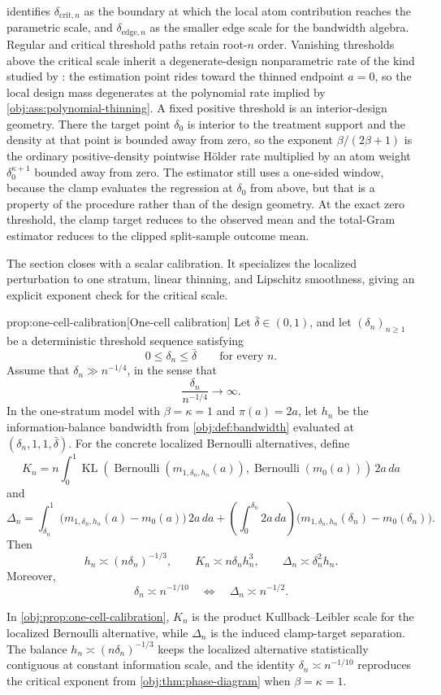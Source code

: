  identifies \(\delta_{\mathrm{crit},n}\) as the boundary at which the local atom contribution reaches the parametric scale, and \(\delta_{\mathrm{edge},n}\) as the smaller edge scale for the bandwidth algebra. Regular and critical threshold paths retain root-\(n\) order. Vanishing thresholds above the critical scale inherit a degenerate-design nonparametric rate of the kind studied by \citet{Gaiffas2005DegenerateDesign}: the estimation point rides toward the thinned endpoint \(a=0\), so the local design mass degenerates at the polynomial rate implied by \cref{obj:ass:polynomial-thinning}. A fixed positive threshold is an interior-design geometry. There the target point \(\delta_0\) is interior to the treatment support and the density at that point is bounded away from zero, so the exponent \(\beta/(2\beta+1)\) is the ordinary positive-density pointwise Hölder rate \citep{Stone1982,Donoho1991} multiplied by an atom weight \(\delta_0^{\kappa+1}\) bounded away from zero. The estimator still uses a one-sided window, because the clamp evaluates the regression at \(\delta_0\) from above, but that is a property of the procedure rather than of the design geometry. At the exact zero threshold, the clamp target reduces to the observed mean and the total-Gram estimator reduces to the clipped split-sample outcome mean.

The section closes with a scalar calibration. It specializes the localized perturbation to one stratum, linear thinning, and Lipschitz smoothness, giving an explicit exponent check for the critical scale.

\begin{propositionv}{prop:one-cell-calibration}[One-cell calibration]
Let \(\bar\delta\in(0,1)\), and let \((\delta_n)_{n\geq1}\) be a deterministic threshold sequence satisfying
\[
0\leq \delta_n\leq \bar\delta
\qquad\text{for every }n .
\]
Assume that \(\delta_n\gg n^{-1/4}\), in the sense that
\[
\frac{\delta_n}{n^{-1/4}}\longrightarrow\infty .
\]
In the one-stratum model with \(\beta=\kappa=1\) and \(\pi(a)=2a\), let \(h_n\) be the information-balance bandwidth from \cref{obj:def:bandwidth} evaluated at \((\delta_n,1,1,\bar\delta)\). For the concrete localized Bernoulli alternatives, define
\[
K_n
=
n\int_0^1
\operatorname{KL}\!\left(
\operatorname{Bernoulli}(m_{1,\delta_n,h_n}(a)),
\operatorname{Bernoulli}(m_0(a))
\right)\,2a\,da
\]
and
\[
\Delta_n
=
\int_{\delta_n}^1
\bigl(m_{1,\delta_n,h_n}(a)-m_0(a)\bigr)\,2a\,da
+
\left(\int_0^{\delta_n}2a\,da\right)
\bigl(m_{1,\delta_n,h_n}(\delta_n)-m_0(\delta_n)\bigr).
\]
Then
\[
h_n\asymp (n\delta_n)^{-1/3},
\qquad
K_n\asymp n\delta_n h_n^3,
\qquad
\Delta_n\asymp \delta_n^2h_n.
\]
Moreover,
\[
\delta_n\asymp n^{-1/10}
\quad\Longleftrightarrow\quad
\Delta_n\asymp n^{-1/2}.
\]
\end{propositionv}

In \cref{obj:prop:one-cell-calibration}, \(K_n\) is the product Kullback--Leibler scale for the localized Bernoulli alternative, while \(\Delta_n\) is the induced clamp-target separation. The balance \(h_n\asymp(n\delta_n)^{-1/3}\) keeps the localized alternative statistically contiguous at constant information scale, and the identity \(\delta_n\asymp n^{-1/10}\) reproduces the critical exponent from \cref{obj:thm:phase-diagram} when \(\beta=\kappa=1\).

